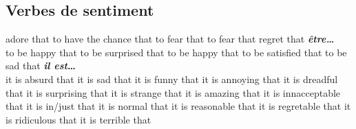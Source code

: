 \subsection*{Verbes de sentiment}

   {adore that}
   {to have the chance that}
   {to fear that}
   {to fear that}
   {regret that}
     {\bf {\em être\ldots}}\\
   {to be happy that}
   {to be surprised that}
   {to be happy that}
   {to be satisfied that}
   {to be sad that}
     {\bf {\em il est}\ldots}\\
        {it is absurd that}
        {it is sad that}
        {it is funny that}
        {it is annoying that}
        {it is dreadful that}
        {it is surprising that}
        {it is strange that}
        {it is amazing that}
        {it is innacceptable that}
        {it is in/just that}
        {it is normal that}
        {it is reasonable that}
        {it is regretable that}
        {it is ridiculous that}
        {it is terrible that}
